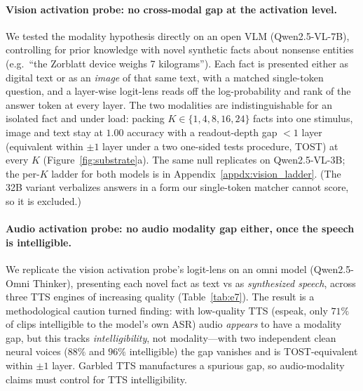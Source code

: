 \documentclass[11pt]{article}
\begin{document}
\paragraph{Vision activation probe: no cross-modal gap at the activation level.}
We tested the modality hypothesis directly on an open VLM (Qwen2.5-VL-7B), controlling for prior knowledge with novel synthetic facts about nonsense entities (e.g.\ ``the Zorblatt device weighs 7 kilograms''). Each fact is presented either as digital text or as an \emph{image} of that same text, with a matched single-token question, and a layer-wise logit-lens reads off the log-probability and rank of the answer token at every layer. The two modalities are indistinguishable for an isolated fact and under load: packing $K\in\{1,4,8,16,24\}$ facts into one stimulus, image and text stay at $1.00$ accuracy with a readout-depth gap $<1$ layer (equivalent within $\pm 1$ layer under a two one-sided tests procedure, TOST) at every $K$ (Figure~\ref{fig:substrate}a). The same null replicates on Qwen2.5-VL-3B; the per-$K$ ladder for both models is in Appendix~\ref{appdx:vision_ladder}. (The 32B variant verbalizes answers in a form our single-token matcher cannot score, so it is excluded.)

\paragraph{Audio activation probe: no audio modality gap either, once the speech is intelligible.}
We replicate the vision activation probe's logit-lens on an omni model (Qwen2.5-Omni Thinker), presenting each novel fact as text vs as \emph{synthesized speech}, across three TTS engines of increasing quality (Table~\ref{tab:e7}). The result is a methodological caution turned finding: with low-quality TTS (espeak, only $71\%$ of clips intelligible to the model's own ASR) audio \emph{appears} to have a modality gap, but this tracks \emph{intelligibility}, not modality---with two independent clean neural voices ($88\%$ and $96\%$ intelligible) the gap vanishes and is TOST-equivalent within $\pm 1$ layer. Garbled TTS manufactures a spurious gap, so audio-modality claims must control for TTS intelligibility.
\end{document}

